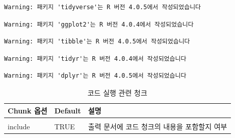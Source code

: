 \documentclass[
  11pt,
]{krantz}
\newenvironment{Shaded}{\begin{snugshade}}{\end{snugshade}}
\newcommand{\InformationTok}[1]{\textcolor[rgb]{0.37,0.37,0.37}{\textbf{\textit{#1}}}}
\begin{document}
\begin{verbatim}
Warning: 패키지 'tidyverse'는 R 버전 4.0.5에서 작성되었습니다
\end{verbatim}

\begin{verbatim}
Warning: 패키지 'ggplot2'는 R 버전 4.0.4에서 작성되었습니다
\end{verbatim}

\begin{verbatim}
Warning: 패키지 'tibble'는 R 버전 4.0.5에서 작성되었습니다
\end{verbatim}

\begin{verbatim}
Warning: 패키지 'tidyr'는 R 버전 4.0.4에서 작성되었습니다
\end{verbatim}

\begin{verbatim}
Warning: 패키지 'dplyr'는 R 버전 4.0.5에서 작성되었습니다
\end{verbatim}

\begin{table}[H]

\caption{\label{tab:chunk-tab-01}코드 실행 관련 청크}
\centering
\fontsize{14}{16}\selectfont
\begin{tabular}[t]{>{\raggedright\arraybackslash}p{3cm}>{\raggedright\arraybackslash}p{3cm}>{\raggedright\arraybackslash}p{8cm}}
\toprule
Chunk 옵션 & Default & 설명\\
\midrule
\cellcolor{gray!6}{eval} & \cellcolor{gray!6}{TRUE} & \cellcolor{gray!6}{R 실행(코드 실행 결과)에 대응하는 결과 출력 여부}\\
include & TRUE & 출력 문서에 코드 청크의 내용을 포함할지 여부\\
\bottomrule
\end{tabular}
\end{table}

\normalsize

\begin{Shaded}
\end{Shaded}
\end{document}
